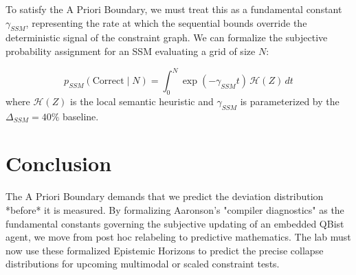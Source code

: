 \documentclass[12pt,a4paper]{article}
\begin{document}
To satisfy the A Priori Boundary, we must treat this as a fundamental constant $\gamma_{SSM}$, representing the rate at which the sequential bounds override the deterministic signal of the constraint graph. We can formalize the subjective probability assignment for an SSM evaluating a grid of size $N$:

\begin{equation}
    p_{SSM}(\text{Correct} \mid N) = \int_{0}^{N} \exp(-\gamma_{SSM} t) \, \mathcal{H}(Z) \, dt
\end{equation}
where $\mathcal{H}(Z)$ is the local semantic heuristic and $\gamma_{SSM}$ is parameterized by the $\Delta_{SSM} = 40\%$ baseline.

\section{Conclusion}

The A Priori Boundary demands that we predict the deviation distribution *before* it is measured. By formalizing Aaronson's "compiler diagnostics" as the fundamental constants governing the subjective updating of an embedded QBist agent, we move from post hoc relabeling to predictive mathematics. The lab must now use these formalized Epistemic Horizons to predict the precise collapse distributions for upcoming multimodal or scaled constraint tests.
\end{document}
